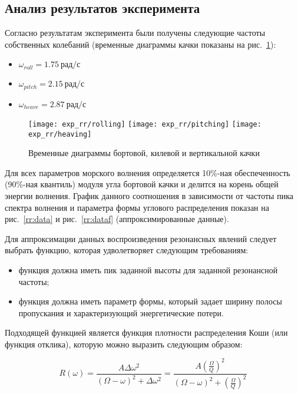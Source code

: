 \subsection{Анализ результатов эксперимента}

Согласно результатам эксперимента были получены следующие частоты собственных колебаний (временные диаграммы качки показаны на рис.~\ref{exp_rr_rolling}):
\begin{itemize}
	\item	$ \omega_{roll} = 1.75\ \text{рад/с}$
	\item	$ \omega_{pitch} = 2.15\ \text{рад/с}$
	\item	$ \omega_{heave} = 2.87\ \text{рад/с}$
\end{itemize}

\begin{figure}[ht]
	\begin{center}
	\texttt{[image: exp\_rr/rolling]}
	\texttt{[image: exp\_rr/pitching]}
	\texttt{[image: exp\_rr/heaving]}
	\end{center}
	\caption{Временные диаграммы бортовой, килевой и вертикальной качки}
	\label{exp_rr_rolling}
\end{figure}

Для всех параметров морского волнения определяется 10\%-ная обеспеченность (90\%-ная квантиль) модуля угла бортовой качки и делится на корень общей энергии волнения. График данного соотношения в зависимости от частоты пика спектра волнения и параметра формы углового распределения показан на рис.~\ref{rr:data} и рис.~\ref{rr:dataf} (аппроксимированные данные).

Для аппроксимации данных воспроизведения резонансных явлений следует выбрать функцию, которая удволетворяет следующим требованиям: 
\begin{itemize}
	\item	функция должна иметь пик заданной высоты для заданной резонансной частоты;
	\item	функция должна иметь параметр формы, который задает ширину полосы пропускания и характеризующий
			энергетические потери.  
\end{itemize} 

Подходящей функцией является функция плотности распределения Коши (или функция отклика), которую можно выразить следующим образом:

\begin{equation}
	R(\omega) = \frac{A \Delta \omega^2} {  (\Omega-\omega)^2 + \Delta \omega^2 } 
		 = \frac{A \left( \frac{\Omega}{Q} \right) ^2} {  (\Omega-\omega)^2 + \left( \frac{\Omega}{Q} \right) ^2 } 
\label{cauchy}
\end{equation}

